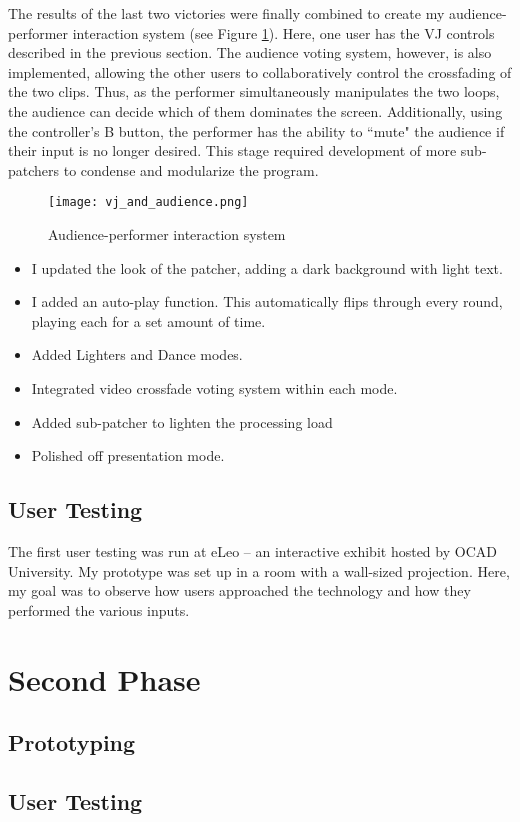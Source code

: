 The results of the last two victories were finally combined to create my audience-performer interaction system (see Figure \ref{prototyping6}). Here, one user has the VJ controls described in the previous section. The audience voting system, however, is also implemented, allowing the other users to collaboratively control the crossfading of the two clips. Thus, as the performer simultaneously manipulates the two loops, the audience can decide which of them dominates the screen. Additionally, using the controller's B button, the performer has the ability to ``mute" the audience if their input is no longer desired. This stage required development of more sub-patchers to condense and modularize the program.

\begin{figure}[t]
	\centering

	\texttt{[image: vj\_and\_audience.png]}
	\caption{Audience-performer interaction system}

	\label{prototyping6}
\end{figure}

\begin{itemize}
	\item I updated the look of the patcher, adding a dark background with light text.
	\item I added an auto-play function. This automatically flips through every round, playing each for a set amount of time.
	\item Added Lighters and Dance modes.
	\item Integrated video crossfade voting system within each mode.
	\item Added sub-patcher to lighten the processing load
	\item Polished off presentation mode.
\end{itemize}


\subsection{User Testing}

The first user testing was run at eLeo -- an interactive exhibit hosted by OCAD University. My prototype was set up in a room with a wall-sized projection. Here, my goal was to observe how users approached the technology and how they performed the various inputs.


\section{Second Phase}

\subsection{Prototyping}

\subsection{User Testing}